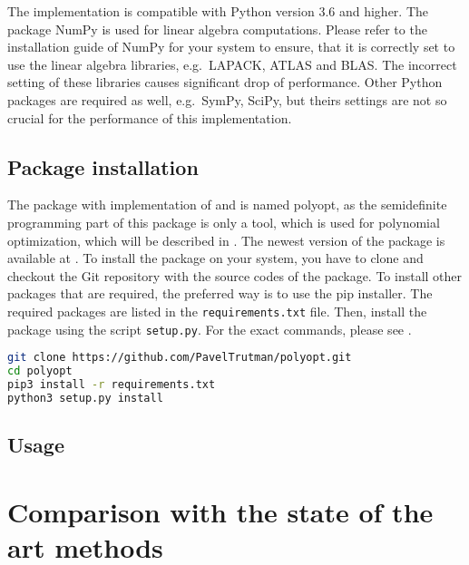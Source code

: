The implementation is compatible with Python version 3.6 and higher.
The package NumPy\cite{numpy} is used for linear algebra computations.
Please refer to the installation guide of NumPy for your system to ensure, that it is correctly set to use the linear algebra libraries, e.g.\ LAPACK\cite{lapack}, ATLAS\cite{atlas} and BLAS\cite{blas}.
The incorrect setting of these libraries causes significant drop of performance.
Other Python packages are required as well, e.g.\ SymPy\cite{sympy}, SciPy\cite{scipy}, but theirs settings are not so crucial for the performance of this implementation.

\subsection{Package installation}
The package with implementation of  and  is named polyopt, as the semidefinite programming part of this package is only a tool, which is  used for polynomial optimization, which will be described in .
The newest version of the package is available at \cite{polyopt}.
To install the package on your system, you have to clone and checkout the Git repository with the source codes of the package.
To install other packages that are required, the preferred way is to use the pip installer. The required packages are listed in the \texttt{requirements.txt} file.
Then, install the package using the script \texttt{setup.py}.
For the exact commands, please see .
\begin{lstlisting}[language=bash, caption={Installation of the package polyopt.}, labellis={SDP:imp:install}]
git clone https://github.com/PavelTrutman/polyopt.git
cd polyopt
pip3 install -r requirements.txt
python3 setup.py install
\end{lstlisting}
\subsection{Usage}

\section{Comparison with the state of the art methods}

